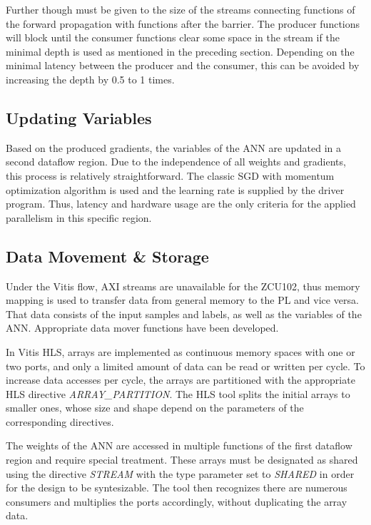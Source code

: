 Further though must be given to the size of the streams connecting functions of the forward propagation with functions after the barrier. The producer functions will block until the consumer functions clear some space in the stream if the minimal depth is used as mentioned in the preceding section. Depending on the minimal latency between the producer and the consumer, this can be avoided by increasing the depth by 0.5 to 1 times.

\subsection{Updating Variables}
\label{sec:Updating_Variables}
Based on the produced gradients, the variables of the ANN are updated in a second dataflow region. Due to the independence of all weights and gradients, this process is relatively straightforward. The classic SGD with momentum optimization algorithm is used and the learning rate is supplied by the driver program. Thus, latency and hardware usage are the only criteria for the applied parallelism in this specific region.

\subsection{Data Movement \& Storage}
Under the Vitis flow, AXI streams are unavailable for the ZCU102, thus memory mapping is used to transfer data from general memory to the PL and vice versa. That data consists of the input samples and labels, as well as the variables of the ANN. Appropriate data mover functions have been developed. %

In Vitis HLS, arrays are implemented as continuous memory spaces with one or two ports, and only a limited amount of data can be read or written per cycle. To increase data accesses per cycle, the arrays are partitioned with the appropriate HLS directive \emph{ARRAY\_PARTITION}. The HLS tool splits the initial arrays to smaller ones, whose size and shape depend on the parameters of the corresponding directives. %

The weights of the ANN are accessed in multiple functions of the first dataflow region and require special treatment. These arrays must be designated as shared using the directive \emph{STREAM} with the type parameter set to \emph{SHARED} in order for the design to be syntesizable. The tool then recognizes there are numerous consumers and multiplies the ports accordingly, without duplicating the array data. %


